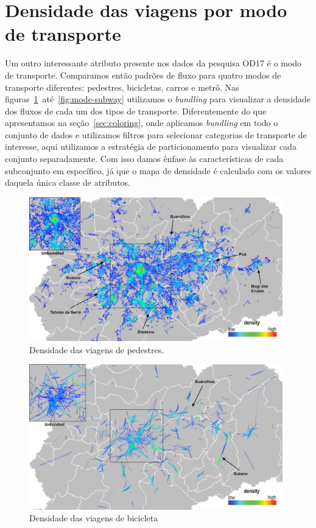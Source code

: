 \section{Densidade das viagens por modo de transporte}
\label{sec:mode}

Um outro interessante atributo presente nos dados da pesquisa OD17 é o modo de
transporte. Comparamos então padrões de fluxo para quatro modos de transporte
diferentes: pedestres, bicicletas, carros e metrô. Nas
figuras~\ref{fig:mode-pedestrian}~até~\ref{fig:mode-subway} utilizamos o
\emph{bundling} para visualizar a densidade dos fluxos de cada um dos tipos de
transporte. Diferentemente do que apresentamos na seção~\ref{sec:coloring}, onde
aplicamos \emph{bundling} em todo o conjunto de dados e utilizamos filtros para
selecionar categorias de transporte de interesse, aqui utilizamos a estratégia de
particionamento para visualizar cada conjunto separadamente. Com isso damos
ênfase às características de cada subconjunto em específico, já que o
mapa de densidade é calculado com os valores daquela única classe de atributos.
 
\begin{figure}[!htb]
  \centering
  \captionsetup{justification=centering}
  \includegraphics[width=0.98\textwidth]{../figuras/mode-pedestrian-density-leg.png}
  \caption{Densidade das viagens de pedestres. \label{fig:mode-pedestrian}}
\end{figure}

\begin{figure}[!htb]
  \centering
  \captionsetup{justification=centering}
  \includegraphics[width=0.98\textwidth]{../figuras/mode-bike-density-leg.png}
  \caption{Densidade das viagens de bicicleta \label{fig:mode-bike}}
\end{figure}

